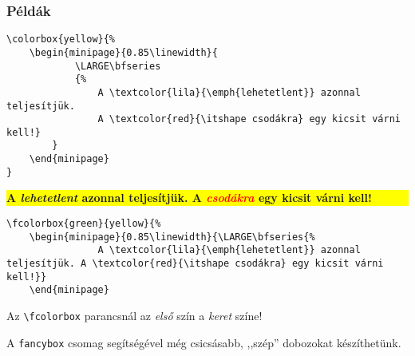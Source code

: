 \documentclass{article}
\begin{document}
\vspace*{2ex}\vspace*{2ex}


\subsubsection*{Példák}

\vspace*{2ex}
\begin{verbatim}
\colorbox{yellow}{%
	\begin{minipage}{0.85\linewidth}{
			\LARGE\bfseries
			{%
				A \textcolor{lila}{\emph{lehetetlent}} azonnal teljesítjük. 
				A \textcolor{red}{\itshape csodákra} egy kicsit várni kell!}
		}
	\end{minipage}
}
\end{verbatim}
\colorbox{yellow}{%
\begin{minipage}{0.85\linewidth}{
		\LARGE\bfseries
		{%
            A \textcolor{lila}{\emph{lehetetlent}} azonnal teljesítjük. A \textcolor{red}{\itshape csodákra} egy kicsit várni kell!}
        }
\end{minipage}
}\vspace*{2ex}

\begin{verbatim}
\fcolorbox{green}{yellow}{%
	\begin{minipage}{0.85\linewidth}{\LARGE\bfseries{%
				A \textcolor{lila}{\emph{lehetetlent}} azonnal teljesítjük. A \textcolor{red}{\itshape csodákra} egy kicsit várni kell!}}
	\end{minipage}
\end{verbatim}
\vspace*{2ex}
\vspace*{2ex}

Az {\color{blue} \verb!\fcolorbox! }parancsnál az \emph{első} szín a \emph{keret} színe!

A \texttt{fancybox} csomag segítségével még csicsásabb, ,,szép'' dobozokat készíthetünk.
\end{document}
